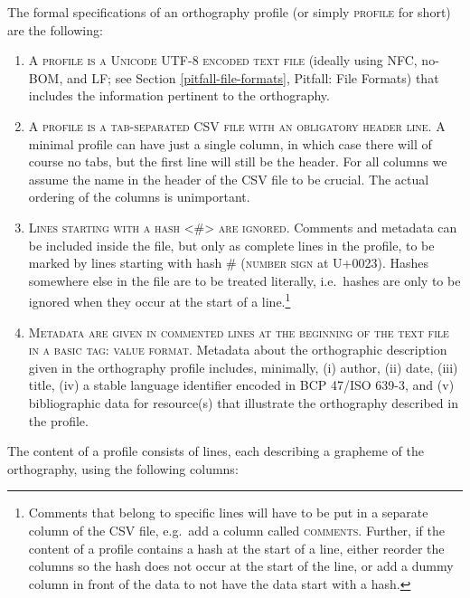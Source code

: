 The formal specifications of an orthography profile (or simply \textsc{profile}
for short) are the following:

\begin{enumerate}
	\def\labelenumi{\arabic{enumi}.} \item \textsc{A profile is a}
	\textsc{Unicode UTF-8 encoded text file} (ideally using NFC, no-BOM, and
	LF; see Section \ref{pitfall-file-formats}, Pitfall: File Formats) that
	includes the information pertinent to the orthography.  \item \textsc{A
	profile is a} \textsc{tab-separated CSV file with an obligatory header
	line}. A minimal profile can have just a single column, in which case
	there will of course no tabs, but the first line will still be the
	header. For all columns we assume the name in the header of the CSV file
	to be crucial. The actual ordering of the columns is unimportant.  \item
	\textsc{Lines starting with a hash \textless{}\#\textgreater{} are
	ignored.} Comments and metadata can be included inside the file, but
	only as complete lines in the profile, to be marked by lines starting
	with hash \textsc{\#} (\textsc{number sign} at U+0023). Hashes somewhere
	else in the file are to be treated literally, i.e.~hashes are only to be
	ignored when they occur at the start of a line.\footnote{Comments that
	belong to specific lines will have to be put in a separate column of the
	CSV file, e.g.~add a column called \textsc{comments}. Further, if the
	content of a profile contains a hash at the start of a line, either
	reorder the columns so the hash does not occur at the start of the line,
	or add a dummy column in front of the data to not have the data start
	with a hash.} \item \textsc{Metadata are given in commented lines at the
	beginning of the text file in a basic \textsc{tag: value} format.
	}Metadata about the orthographic description given in the orthography
	profile includes, minimally, (i) author, (ii) date, (iii) title, (iv) a
	stable language identifier encoded in BCP 47/ISO 639-3, and (v)
	bibliographic data for resource(s) that illustrate the orthography
	described in the profile.
\end{enumerate}

The content of a profile consists of lines, each describing a grapheme of the
orthography, using the following columns:

